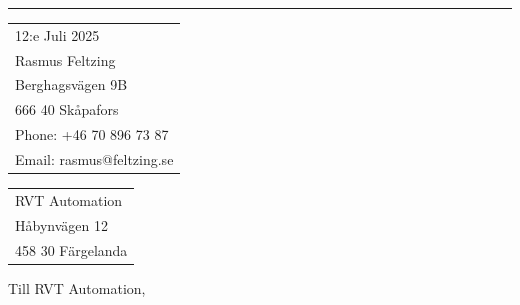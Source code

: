 \documentclass{article}
\begin{document}


\vspace{-1em} %

\rule{\linewidth}{1pt} %

\bigskip\bigskip %


\hfill
\begin{tabular}{l @{}}
	12:e Juli 2025 \bigskip\\ %
	Rasmus Feltzing \\
	Berghagsvägen 9B \\ %
	666 40 Skåpafors \\
	Phone: +46 70 896 73 87 \\
	Email: rasmus@feltzing.se
\end{tabular}

\bigskip %


\begin{tabular}{@{} l}
	RVT Automation\\
	Håbynvägen 12\\
	458 30 Färgelanda
\end{tabular}

\bigskip %

Till RVT Automation,

\bigskip %


\end{document}
